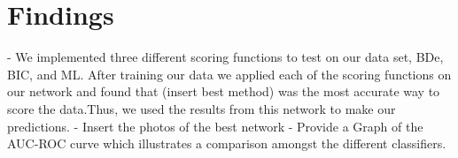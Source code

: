 \section{Findings}
- We implemented three different scoring functions to test on our data set, BDe, BIC, and ML.  After training our data we applied each of the scoring functions on our network and found that (insert best method) was the most accurate way to score the data.Thus, we used the results from this network to make our predictions. 
- Insert the photos of the best network 
- Provide a Graph of the AUC-ROC curve which illustrates a comparison amongst the different classifiers.
     
